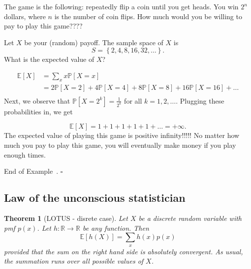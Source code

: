 \documentclass[10pt]{article}
\newtheorem{theorem}{Theorem}
\theoremstyle{definition}
\newtheorem{example}[theorem]{Example}
\renewenvironment{example}
{\begin{oldexample}}
  {\par\smallskip\hfill   End of Example~\theexample. $\square$    \par\end{oldexample}}
\newcommand{\1}[1]{\textbf{1}_{\left[#1\right]}} %
\def\R{\mathbb{R}} %
\def\E{\mathbb{E}} %
\def\P{\mathbb{P}} %
\begin{document}
\begin{example}[St. Petersburg Paradox]
  \label{ex:st.-petersburg-paradox}
  The game is the following: repeatedly flip a coin until you get heads. You
  win $2^{n}$ dollars, where $n$ is the number of coin flips. How much would
  you be willing to pay to play this game????

  Let $X$ be your (random) payoff. The sample space of $X$ is
  \begin{equation*}
    S = \left\{2,4,8,16,32,\ldots\right\}.
  \end{equation*}
  What is the expected value of $X$?

\begin{align*}
  \E\left[X \right] 
  &= \sum_{x} x \P\left[X=x \right]\\
  &= 2\P\left[X=2 \right]+ 4 \P\left[X=4 \right] + 8\P\left[X=8 \right] + 16 \P\left[X=16 \right]+\ldots\\
\end{align*}
Next, we observe that $\P\left[X=2^{k} \right] = \frac{1}{2^{k}}$ for all
$k =1,2,\ldots$. Plugging these probabilities in, we get

\begin{equation*}
  \E\left[X \right] = 1+1+1+1+1+\ldots   = +\infty.
\end{equation*}
The expected value of playing this game is positive infinity!!!!! No matter
how much you pay to play this game, you will eventually make money if you play
enough times.
\end{example}
\subsection{Law of the unconscious statistician}

\begin{theorem}[LOTUS - disrete case] 
  \label{thm:LOTUS-discrete-case}
  Let $X$ be a discrete random variable with pmf $p(x)$. Let $h:\R \to \R$ be any function. Then
  \begin{equation*}
    \E\left[h(X) \right] = \sum_{x} h(x)p(x) 
  \end{equation*}
  provided that the sum on the right hand side is absolutely convergent. As usual, the summation runs
  over all possible values of $X$.
\end{theorem}
\end{document}
